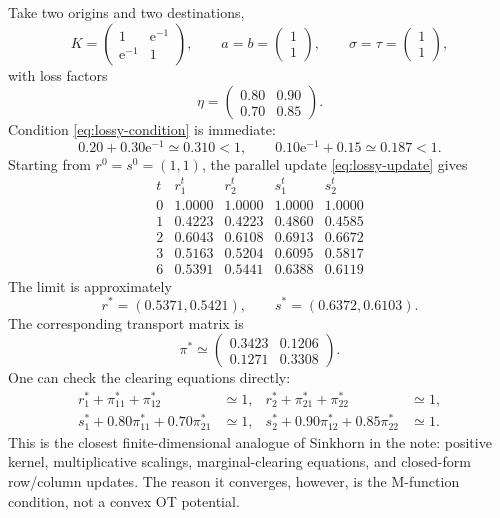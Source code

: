 \documentclass[11pt]{article}
\newcommand{\e}{\mathrm{e}}
\theoremstyle{definition}
\theoremstyle{plain}
\begin{document}
Take two origins and two destinations,
\[
        K=\begin{pmatrix}
        1&\e^{-1}\\
        \e^{-1}&1
        \end{pmatrix},\qquad
        a=b=\begin{pmatrix}1\\1\end{pmatrix},
        \qquad
        \sigma=\tau=\begin{pmatrix}1\\1\end{pmatrix},
\]
with loss factors
\[
        \eta=\begin{pmatrix}
        0.80&0.90\\
        0.70&0.85
        \end{pmatrix}.
\]
Condition \eqref{eq:lossy-condition} is immediate:
\[
        0.20+0.30\e^{-1}\simeq0.310<1,
        \qquad
        0.10\e^{-1}+0.15\simeq0.187<1.
\]
Starting from $r^0=s^0=(1,1)$, the parallel update \eqref{eq:lossy-update} gives
\[
\begin{array}{c|cccc}
        t&r_1^t&r_2^t&s_1^t&s_2^t\\
        \hline
        0&1.0000&1.0000&1.0000&1.0000\\
        1&0.4223&0.4223&0.4860&0.4585\\
        2&0.6043&0.6108&0.6913&0.6672\\
        3&0.5163&0.5204&0.6095&0.5817\\
        6&0.5391&0.5441&0.6388&0.6119
\end{array}
\]
The limit is approximately
\[
        r^*=(0.5371,0.5421),
        \qquad
        s^*=(0.6372,0.6103).
\]
The corresponding transport matrix is
\[
        \pi^*\simeq
        \begin{pmatrix}
        0.3423&0.1206\\
        0.1271&0.3308
        \end{pmatrix}.
\]
One can check the clearing equations directly:
\begin{align*}
        r_1^*+\pi_{11}^*+\pi_{12}^*&\simeq1,
        &r_2^*+\pi_{21}^*+\pi_{22}^*&\simeq1,\\
        s_1^*+0.80\pi_{11}^*+0.70\pi_{21}^*&\simeq1,
        &s_2^*+0.90\pi_{12}^*+0.85\pi_{22}^*&\simeq1.
\end{align*}
This is the closest finite-dimensional analogue of Sinkhorn in the note: positive kernel, multiplicative scalings, marginal-clearing equations, and closed-form row/column updates. The reason it converges, however, is the M-function condition, not a convex OT potential.
\end{document}
